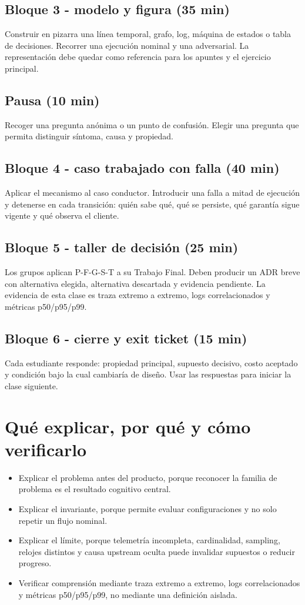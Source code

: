 \documentclass[variant=docente,cover=institutional,mode=screen]{ua-engineering-v6-article}
\begin{document}
\subsection*{Bloque 3 - modelo y figura (35 min)}
Construir en pizarra una línea temporal, grafo, log, máquina de estados o tabla de decisiones. Recorrer una ejecución nominal y una adversarial. La representación debe quedar como referencia para los apuntes y el ejercicio principal.

\subsection*{Pausa (10 min)}
Recoger una pregunta anónima o un punto de confusión. Elegir una pregunta que permita distinguir síntoma, causa y propiedad.

\subsection*{Bloque 4 - caso trabajado con falla (40 min)}
Aplicar el mecanismo al caso conductor. Introducir una falla a mitad de ejecución y detenerse en cada transición: quién sabe qué, qué se persiste, qué garantía sigue vigente y qué observa el cliente.

\subsection*{Bloque 5 - taller de decisión (25 min)}
Los grupos aplican P-F-G-S-T a su Trabajo Final. Deben producir un ADR breve con alternativa elegida, alternativa descartada y evidencia pendiente. La evidencia de esta clase es traza extremo a extremo, logs correlacionados y métricas p50/p95/p99.

\subsection*{Bloque 6 - cierre y exit ticket (15 min)}
Cada estudiante responde: propiedad principal, supuesto decisivo, costo aceptado y condición bajo la cual cambiaría de diseño. Usar las respuestas para iniciar la clase siguiente.

\section{Qué explicar, por qué y cómo verificarlo}
\begin{itemize}
\item Explicar el problema antes del producto, porque reconocer la familia de problema es el resultado cognitivo central.
\item Explicar el invariante, porque permite evaluar configuraciones y no solo repetir un flujo nominal.
\item Explicar el límite, porque telemetría incompleta, cardinalidad, sampling, relojes distintos y causa upstream oculta puede invalidar supuestos o reducir progreso.
\item Verificar comprensión mediante traza extremo a extremo, logs correlacionados y métricas p50/p95/p99, no mediante una definición aislada.
\end{itemize}
\end{document}
